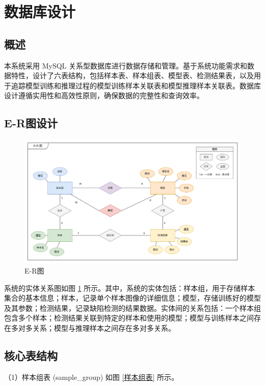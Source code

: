 \documentclass[
  ]{njuthesis}
\begin{document}
\section{数据库设计}

\subsection{概述}

本系统采用 MySQL 关系型数据库进行数据存储和管理。基于系统功能需求和数据特性，设计了六表结构，包括样本表、样本组表、模型表、检测结果表，以及用于追踪模型训练和推理过程的模型训练样本关联表和模型推理样本关联表。数据库设计遵循实用性和高效性原则，确保数据的完整性和查询效率。

\subsection{E-R图设计}

\begin{figure}[H]
    \centering
    \includegraphics[width=\textwidth]{images/E-R图.png}
    \caption{E-R图}
    \label{E-R图}
\end{figure}

系统的实体关系图如图 \ref{E-R图} 所示。其中，系统的实体包括：样本组，用于存储样本集合的基本信息；样本，记录单个样本图像的详细信息；模型，存储训练好的模型及其参数；检测结果，记录缺陷检测的结果数据。实体间的关系包括：一个样本组包含多个样本；检测结果关联到特定的样本和使用的模型；模型与训练样本之间存在多对多关系；模型与推理样本之间存在多对多关系。

\subsection{核心表结构}

（1）样本组表 (sample\_group) 如图 \ref{样本组表} 所示。
\end{document}
